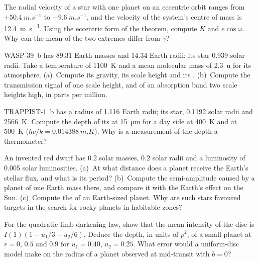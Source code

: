\begin{exercise}[$\star\star$]\label{exo:b3:exoplanets:7}
The radial velocity of a star with one planet on an eccentric orbit
ranges from $+\qty{50.4}{m.s^{-1}}$ to $-\qty{9.6}{m.s^{-1}}$, and the
velocity of the system's centre of mass is \qty{12.4}{m.s^{-1}}. Using the
eccentric form of the theorem, compute $K$ and $e\cos\omega$. Why can the
mean of the two extremes differ from $\gamma$?
\end{exercise}

\begin{exercise}[$\star\star$]\label{exo:b3:exoplanets:8}
WASP-39~b has 89.31 Earth masses and 14.34 Earth radii; its star 0.939
solar radii. Take a temperature of \qty{1100}{K} and a mean molecular
mass of \qty{2.3}{u} for its atmosphere. (a)~Compute its gravity, its
scale height and its . (b)~Compute the transmission signal of
one scale height, and of an absorption band two scale heights high, in
parts per million.
\end{exercise}

\begin{exercise}[$\star\star$]\label{exo:b3:exoplanets:9}
TRAPPIST-1~b has a radius of 1.116 Earth radii; its star, 0.1192 solar
radii and \qty{2566}{K}. Compute the depth of its  at
\qty{15}{\micro m} for a day side at \qty{400}{K} and at \qty{500}{K}
($hc/k = \qty{0.014388}{m.K}$). Why is a measurement of the depth a
thermometer?
\end{exercise}

\begin{exercise}[$\star\star\star$]\label{exo:b3:exoplanets:10}
An invented red dwarf has 0.2 solar masses, 0.2 solar radii and a
luminosity of \num{0.005} solar luminosities. (a)~At what distance does a
planet receive the Earth's stellar flux, and what is its period?
(b)~Compute the semi-amplitude caused by a planet of one Earth mass
there, and compare it with the Earth's effect on the Sun. (c)~Compute the
 of an Earth-sized planet. Why are such stars favoured
targets in the search for rocky planets in habitable zones?
\end{exercise}

\begin{exercise}[$\star\star\star$]\label{exo:b3:exoplanets:11}
For the quadratic limb-darkening law, show that the mean intensity of
the disc is $I(1)(1 - u_1/3 - u_2/6)$. Deduce the depth, in units of
$p^2$, of a small planet at $r = 0$, $0.5$ and $0.9$ for $u_1 = 0.40$,
$u_2 = 0.25$. What error would a uniform-disc model make on the radius of
a planet observed at mid-transit with $b = 0$?
\end{exercise}

